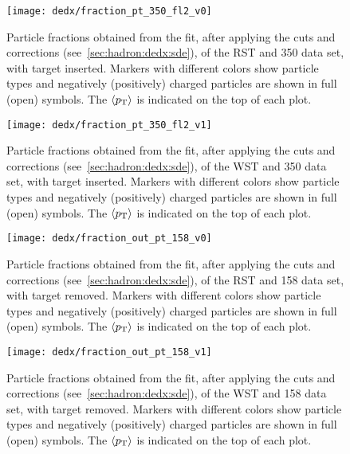 \begin{figure}
  \centering
  \texttt{[image: dedx/fraction\_pt\_350\_fl2\_v0]}
  \caption{Particle fractions obtained from the \dedx fit,
    after applying the cuts and corrections (see~\cref{sec:hadron:dedx:sde}),
    of the RST and 350 \GeVc data set, with target inserted. Markers with different
    colors show particle types and negatively (positively) charged particles are shown
    in full (open) symbols. The $\langle p_\text{T}\rangle$ is indicated on the top of each plot.}
  \label{fig:hadron:dedx:fit:final350r}
\end{figure}

\begin{figure}
  \centering
  \texttt{[image: dedx/fraction\_pt\_350\_fl2\_v1]}
  \caption{Particle fractions obtained from the \dedx fit,
    after applying the cuts and corrections (see~\cref{sec:hadron:dedx:sde}),
    of the WST and 350 \GeVc data set, with target inserted. Markers with different
    colors show particle types and negatively (positively) charged particles are shown
    in full (open) symbols. The $\langle p_\text{T}\rangle$ is indicated on the top of each plot.}
  \label{fig:hadron:dedx:fit:final350w}
\end{figure}

\begin{figure}
  \centering
  \texttt{[image: dedx/fraction\_out\_pt\_158\_v0]}
  \caption{Particle fractions obtained from the \dedx fit,
    after applying the cuts and corrections (see~\cref{sec:hadron:dedx:sde}),
    of the RST and 158 \GeVc data set, with target removed. Markers with different
    colors show particle types and negatively (positively) charged particles are shown
    in full (open) symbols. The $\langle p_\text{T}\rangle$ is indicated on the top of each plot.}
  \label{fig:hadron:dedx:fit:out158r}
\end{figure}

\begin{figure}
  \centering
  \texttt{[image: dedx/fraction\_out\_pt\_158\_v1]}
  \caption{Particle fractions obtained from the \dedx fit,
    after applying the cuts and corrections (see~\cref{sec:hadron:dedx:sde}),
    of the WST and 158 \GeVc data set, with target removed. Markers with different
    colors show particle types and negatively (positively) charged particles are shown
    in full (open) symbols. The $\langle p_\text{T}\rangle$ is indicated on the top of each plot.}
  \label{fig:hadron:dedx:fit:out158w}
\end{figure}

